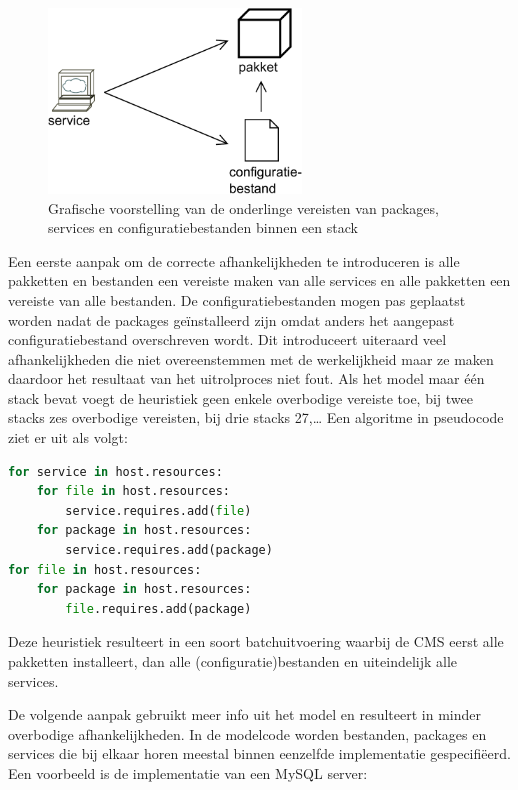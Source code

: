 \begin{figure}[h]
    \begin{center}
    \includegraphics[width=0.6\textwidth]{images/stack.pdf}
    \caption{Grafische voorstelling van de onderlinge vereisten van packages, services en configuratiebestanden binnen een stack}
    \label{fig:stack}
    \end{center}
\end{figure}

Een eerste aanpak om de correcte afhankelijkheden te introduceren is alle pakketten en bestanden een vereiste maken van alle services en alle pakketten een vereiste van alle bestanden.
De configuratiebestanden mogen pas geplaatst worden nadat de packages ge\"installeerd zijn omdat anders het aangepast configuratiebestand overschreven wordt.
Dit introduceert uiteraard veel afhankelijkheden die niet overeenstemmen met de werkelijkheid maar ze maken daardoor het resultaat van het uitrolproces niet fout.
Als het model maar \'e\'en stack bevat voegt de heuristiek geen enkele overbodige vereiste toe, bij twee stacks zes overbodige vereisten, bij drie stacks 27,\ldots
Een algoritme in pseudocode ziet er uit als volgt:

\begin{minipage}{\textwidth}
\begin{lstlisting}[language=Python]
for service in host.resources:
    for file in host.resources:
        service.requires.add(file)
    for package in host.resources:
        service.requires.add(package)
for file in host.resources:
    for package in host.resources:
        file.requires.add(package)
\end{lstlisting}
\end{minipage}

Deze heuristiek resulteert in een soort batchuitvoering waarbij de CMS  eerst alle pakketten installeert, dan alle (configuratie)bestanden en uiteindelijk alle services.

De volgende aanpak gebruikt meer info uit het model en resulteert in minder overbodige afhankelijkheden.
In de modelcode worden bestanden, packages en services die bij elkaar horen meestal binnen eenzelfde implementatie gespecifi\"eerd.
Een voorbeeld is de implementatie van een MySQL server:

